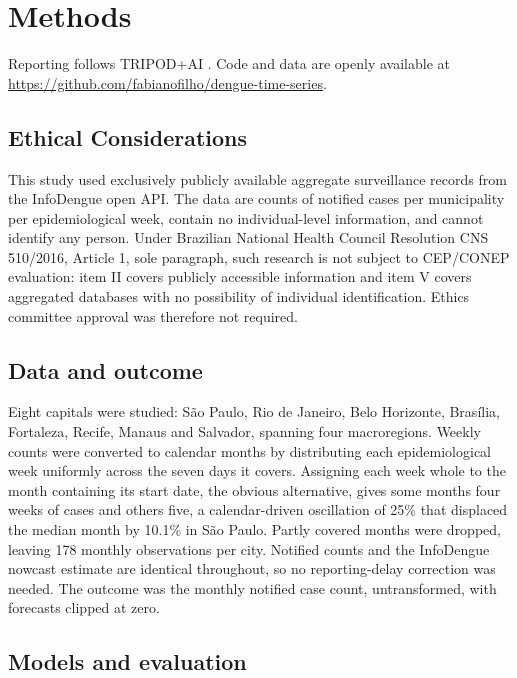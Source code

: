 \documentclass[11pt]{article}
\begin{document}
\section{Methods}

Reporting follows TRIPOD+AI \citep{Collins2024tripod}. Code and data are openly available
at \url{https://github.com/fabianofilho/dengue-time-series}.

\subsection{Ethical Considerations}

This study used exclusively publicly available aggregate surveillance records from the
InfoDengue open API. The data are counts of notified cases per municipality per
epidemiological week, contain no individual-level information, and cannot identify any
person. Under Brazilian National Health Council Resolution CNS 510/2016, Article 1, sole
paragraph, such research is not subject to CEP/CONEP evaluation: item II covers publicly
accessible information and item V covers aggregated databases with no possibility of
individual identification. Ethics committee approval was therefore not required.

\subsection{Data and outcome}

Eight capitals were studied: S\~ao Paulo, Rio de Janeiro, Belo Horizonte, Bras\'ilia,
Fortaleza, Recife, Manaus and Salvador, spanning four macroregions. Weekly counts were
converted to calendar months by distributing each epidemiological week uniformly across
the seven days it covers. Assigning each week whole to the month containing its start
date, the obvious alternative, gives some months four weeks of cases and others five, a
calendar-driven oscillation of 25\% that displaced the median month by 10.1\% in S\~ao
Paulo. Partly covered months were dropped, leaving 178 monthly observations per city.
Notified counts and the InfoDengue nowcast estimate are identical throughout, so no
reporting-delay correction was needed. The outcome was the monthly notified case count,
untransformed, with forecasts clipped at zero.

\subsection{Models and evaluation}
\end{document}
